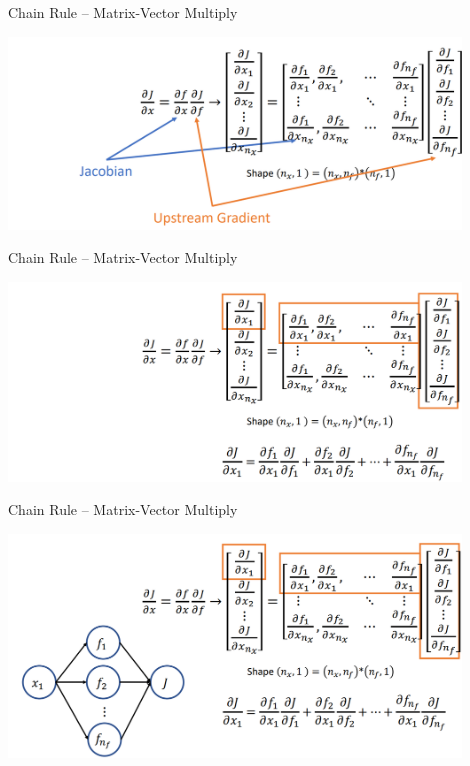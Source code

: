 \documentclass[serif, aspectratio=169]{beamer}
\begin{document}
\begin{frame}{Chain Rule – Matrix-Vector Multiply}
    \begin{center}
        \includegraphics[width=12cm]{pic/chain3.png}  
    \end{center}
\end{frame}

\begin{frame}{Chain Rule – Matrix-Vector Multiply}
    \begin{center}
        \includegraphics[width=12cm]{pic/chain4.png}  
    \end{center}
\end{frame}

\begin{frame}{Chain Rule – Matrix-Vector Multiply}
    \begin{center}
        \includegraphics[width=12cm]{pic/chain5.png}  
    \end{center}
\end{frame}
\end{document}
